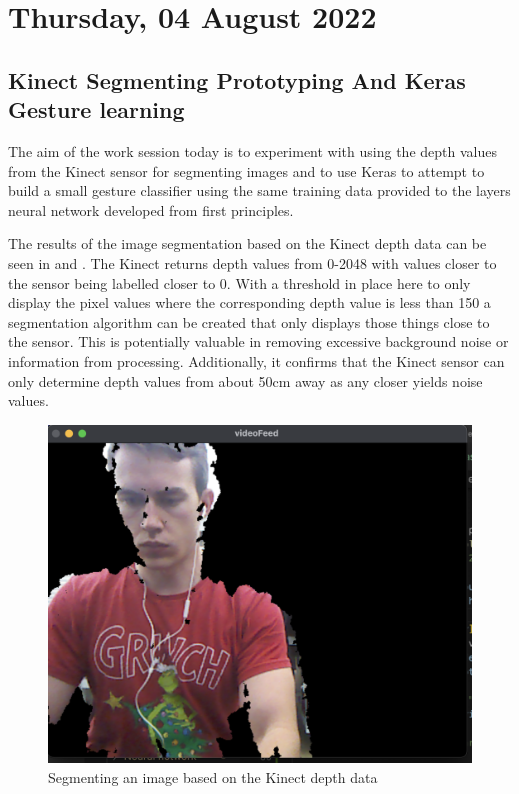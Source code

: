 \section[2022/08/04]{Thursday, 04 August 2022}

\subsection{Kinect Segmenting Prototyping And Keras Gesture learning}

The aim of the work session today is to experiment with using the depth values from the Kinect sensor for segmenting images and to use Keras to attempt to build a small gesture classifier using the same training data provided to the layers neural network developed from first principles.

The results of the image segmentation based on the Kinect depth data can be seen in  and . The Kinect returns depth values from 0-2048 with values closer to the sensor being labelled closer to 0. With a threshold in place here to only display the pixel values where the corresponding depth value is less than 150 a segmentation algorithm can be created that only displays those things close to the sensor. This is potentially valuable in removing excessive background noise or information from processing. Additionally, it confirms that the Kinect sensor can only determine depth values from about 50cm away as any closer yields noise values.

\begin{figure}[h]
    \centering
    \includegraphics[width=0.7\linewidth]{figures/kinect_segment1.png}
    \caption{Segmenting an image based on the Kinect depth data}
    \label{fig:kinect_segment1}
\end{figure}

